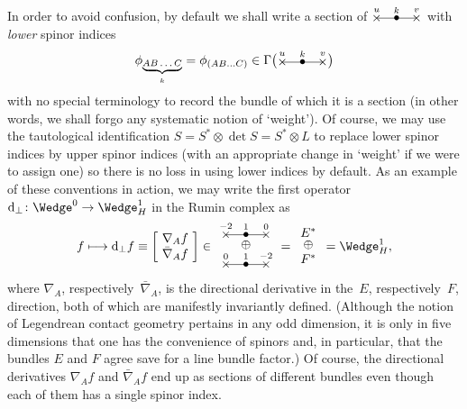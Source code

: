 \documentclass[pdftex]{sigma}%
\numberwithin{equation}{section}
\newcommand{\xox}[3]{\begin{picture}(40,11)
\put(4,1.5){\makebox(0,0){$\times$}}
\put(20,1.5){\makebox(0,0){$\bullet$}}
\put(36,1.5){\makebox(0,0){$\times$}}
\put(4,1.5){\line(1,0){32}}
\put(4,8){\makebox(0,0){$\scriptstyle #1$}}
\put(20,8){\makebox(0,0){$\scriptstyle #2$}}
\put(36,8){\makebox(0,0){$\scriptstyle #3$}}
\end{picture}}
\begin{document}
In order to avoid confusion, by default we shall write a section of
$\xox{u}{k}{v}$ with {\em lower} spinor indices
\[\phi_{\mbox{\scriptsize$\underbrace{AB\dots C}_k$}}=\phi_{(AB\dots C)}
\in\Gamma\big(\xox{u}{k}{v}\big)\]
with no special terminology to record the bundle of which it is a section (in
other words, we shall forgo any systematic notion of `weight'). Of course, we
may use the tautological identification $S=S^*\otimes\det S=S^*\otimes L$ to
replace lower spinor indices by upper spinor indices (with an appropriate
change in `weight' if we were to assign one) so there is no loss in using lower
indices by default. As an example of these conventions in action, we may write
the first operator ${\rm d}_\perp\colon \Wedge^0\to\Wedge_H^1$ in the Rumin complex as
\begin{equation}\label{first_rumin}
f\longmapsto {\rm d}_\perp f\equiv\left[\!\begin{array}{c}\nabla_Af\\
\bar\nabla_Af\end{array}\!\right]
\in\begin{array}{c}\xox{-2}{1}{0}\\[-3pt] \oplus\\ \xox{0}{1}{-2}\end{array}
=\begin{array}{c}E^*\\[-3pt] \oplus\\ F^*\end{array}=\Wedge^1_H,
\end{equation}
where $\nabla_A$, respectively~$\bar\nabla_A$, is the directional derivative in
the~$E$, respectively~$F$, direction, both of which are manifestly invariantly
defined. (Although the notion of Legendrean contact geometry pertains in any
odd dimension, it is only in five dimensions that one has the convenience of
spinors and, in particular, that the bundles $E$ and $F$ agree save for a line
bundle factor.) Of course, the directional derivatives $\nabla_Af$ and
$\bar\nabla_Af$ end up as sections of different bundles even though each of
them has a single spinor index.
\end{document}
